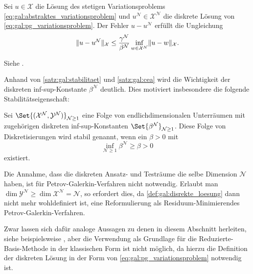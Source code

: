 \begin{Satz}
    \label{satz:gal:cea}
    Sei $u \in \mathcal X$ die Lösung des stetigen Variationsproblems \cref{eq:gal:abstraktes_variationsproblem} und $u^{\mathcal N} \in \mathcal X^{\mathcal N}$ die diskrete Lösung von \cref{eq:gal:pg_variationsproblem}.
    Der Fehler $u - u^{\mathcal N}$ erfüllt die Ungleichung
    \begin{equation}
        \label{eq:gal:cea}
        \lVert u - u^{\mathcal N}\rVert_{\mathcal X} \leq \frac{\gamma^{\mathcal N}}{\beta^{\mathcal N}} \inf_{w \in \mathcal X^{\mathcal N}} \lVert u - w\rVert_{\mathcal X}.
    \end{equation}

    \begin{Beweis}
        Siehe \cite[Theorem 3.2]{Nochetto:2009il}.
    \end{Beweis}
\end{Satz}

Anhand von \cref{satz:gal:stabilitaet} und \cref{satz:gal:cea} wird die Wichtigkeit der diskreten inf-sup-Konstante $\beta^{\mathcal N}$ deutlich.
Dies motiviert insbesondere die folgende Stabilitätseigenschaft:

\begin{Definition}
    Sei $\Set{(\mathcal X^{\mathcal N}, \mathcal Y^{\mathcal N})}_{\mathcal N \geq 1}$ eine Folge von endlichdimensionalen Unterräumen mit zugehörigen diskreten inf-sup-Konstanten $\Set{\beta^{\mathcal N}}_{\mathcal N \geq 1}$.
    Diese Folge von Diskretisierungen wird stabil genannt, wenn ein $\beta > 0$ mit
    \begin{equation}
        \inf_{\mathcal N \geq 1} \beta^{\mathcal N} \geq \beta > 0
    \end{equation}
    existiert.
\end{Definition}

\begin{Bemerkung}
    Die Annahme, dass die diskreten Ansatz- und Testräume die selbe Dimension $\mathcal N$ haben, ist für Petrov-Galerkin-Verfahren nicht notwendig.
    Erlaubt man $\dim \mathcal Y^{\mathcal N} \geq \dim \mathcal X^{\mathcal N} = \mathcal N$, so erfordert dies, da \cref{def:gal:disrekte_loesung} dann nicht mehr wohldefiniert ist, eine Reformulierung als Residuum-Minimierendes Petrov-Galerkin-Verfahren.

    Zwar lassen sich dafür analoge Aussagen zu denen in diesem Abschnitt herleiten, siehe beispielsweise \cite{Andreev:2012ep,Andreev:2013gk}, aber
    die Verwendung als Grundlage für die Reduzierte-Basis-Methode in der klassischen Form ist nicht möglich, da hierzu die Definition der diskreten Lösung in der Form von \cref{eq:gal:pg_variationsproblem} notwendig ist.
\end{Bemerkung}

